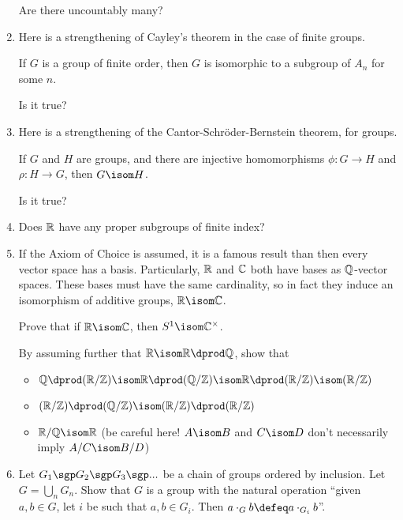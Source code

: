 \documentclass[a4paper,12pt]{article}
\begin{document}
\begin{enumerate}[leftmargin=*]
  Are there uncountably many?
 \item
  Here is a strengthening of Cayley's theorem in the case of finite groups.
  \begin{tcolorbox}
   If \(G\) is a group of finite order, then \(G\) is isomorphic to a subgroup
   of \(A_n\) for some \(n\).
  \end{tcolorbox}
  Is it true?
 \item
  Here is a strengthening of the Cantor-Schr\"oder-Bernstein theorem, for
  groups.
  \begin{tcolorbox}
   If \(G\) and \(H\) are groups, and there are injective homomorphisms
   \(\phi: G \to H\) and \(\rho: H \to G\), then \(G \isom H\).
  \end{tcolorbox}
  Is it true?
 \item
  Does \(\mathbb R\) have any proper subgroups of finite index?
 \item
  If the Axiom of Choice is assumed, it is a famous result than then every
  vector space has a basis. Particularly, \(\mathbb R\) and \(\mathbb C\) both have bases as
  \(\mathbb Q\)-vector spaces. These bases must have the same cardinality, so in fact
  they induce an isomorphism of additive groups, \(\R \isom \C\).

  Prove that if \(\R \isom \C\), then \(S^1 \isom \C^\times\).

  By assuming further that \(\R \isom \R \dprod \Q\), show that
  \begin{itemize}
   \item
    \(\Q \dprod (\R/\Z) \isom \R \dprod (\Q/\Z) \isom
      \R \dprod (\R/\Z) \isom (\R/\Z)\)
   \item
    \((\R/\Z) \dprod (\Q/\Z) \isom (\R/\Z) \dprod (\R/\Z)\)
   \item
    \(\R/\Q \isom \R\)
    (be careful here! \(A \isom B\) and \(C \isom D\) don't necessarily imply
    \(A/C \isom B/D\))
  \end{itemize}
 \item
  Let \(G_1 \sgp G_2 \sgp G_3 \sgp ...\) be a chain of groups ordered by
  inclusion. Let \(G = \bigcup_n G_n\). Show that \(G\) is a group with the
  natural operation ``given \(a, b \in G\), let \(i\) be such that
  \(a, b \in G_i\). Then \(a \cdot_G b \defeq a \cdot_{G_i} b\)''.


\end{enumerate}
\end{document}
